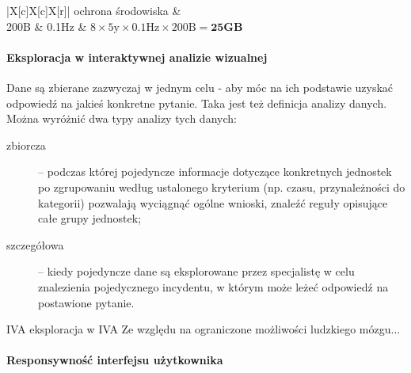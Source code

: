 \begin{table}[H]
\begin{tabu}{|X[c]X[c]X[r]|}
		ochrona środowiska                   &                                                                                \\
		200B                                 & 0.1Hz                                                       & $8 \times 5\mbox{y} \times 0.1\mbox{Hz} \times 200\mbox{B} = \textbf{25GB}$       \\ \hline
	\end{tabu}
	\caption{Przykłady danych pomiarowych}
	\label{table:measurementDataExamples}
\end{table}


\paragraph{Eksploracja w interaktywnej analizie wizualnej}
Dane są zbierane zazwyczaj w jednym celu - aby móc na ich podstawie uzyskać odpowiedź na jakieś konkretne pytanie. Taka jest też definicja analizy danych.
Można wyróżnić dwa typy analizy tych danych:
\begin{description}
	\item[zbiorcza]-- podczas której pojedyncze informacje dotyczące konkretnych jednostek po zgrupowaniu według ustalonego kryterium (np. czasu, przynależności do kategorii) pozwalają wyciągnąć ogólne wnioski, znaleźć reguły opisujące całe grupy jednostek;
	
	\item[szczegółowa]-- kiedy pojedyncze dane są eksplorowane przez specjalistę w celu znalezienia pojedycznego incydentu, w którym może leżeć odpowiedź na postawione pytanie.
\end{description}

IVA
eksploracja w IVA
Ze względu na ograniczone możliwości ludzkiego mózgu...

\paragraph{Responsywność interfejsu użytkownika}

